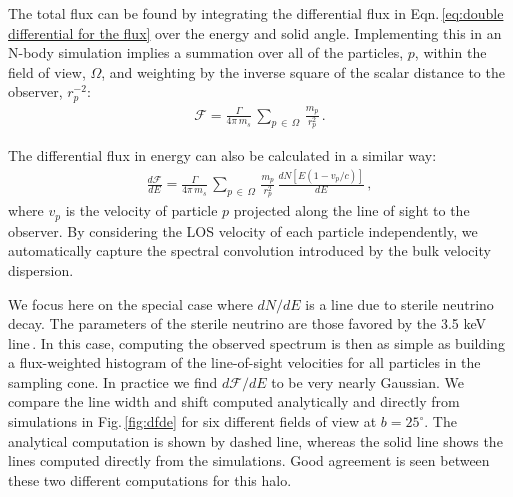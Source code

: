 \documentclass[aps,prd,10pt,twocolumn,superscriptaddress,showpacs,footinbib]{revtex4-1}
\begin{document}

The total flux can be found by integrating the differential flux in Eqn.\,\ref{eq:double differential for the flux} over the energy and solid angle.  Implementing this in an N-body simulation implies a summation over all of the particles, $p$, within the field of view, $\Omega$, and weighting by the inverse square of the scalar distance to the observer, $r^{-2}_p$:
\begin{eqnarray} 
\mathcal{F} = \frac{\Gamma}{4\pi \, m_s} \, \sum_{p \, \in \, \Omega} \, \frac{m_p}{r_p^{2}} \, .
\end{eqnarray}

The differential flux in energy can also be calculated in a similar way:
\begin{eqnarray}
\label{eq:discrete}
\frac{d\mathcal{F}}{dE} = \frac{\Gamma}{4 \pi \, m_s}\, \sum_{p \, \in \, \Omega} \,
\frac{m_p}{r_p^{2}} \, \frac{dN[E(1-v_p/c)]}{dE} \, ,
\end{eqnarray}
where $v_p$ is the velocity of particle $p$ projected along the line of sight to the observer.  By
considering the LOS velocity of each particle independently, we automatically capture the spectral
convolution introduced by the bulk velocity dispersion. 

We focus here on the special case where $dN/dE$ is a line due to sterile neutrino decay.  The
parameters of the sterile neutrino are those favored by the 3.5 keV line\,\cite{Bulbul:2014sua}.  In
this case, computing the observed spectrum is then as simple as building a flux-weighted histogram
of the line-of-sight velocities for all particles in the sampling cone. In practice we find
$d\mathcal{F}/dE$ to be very nearly Gaussian. %
We compare the line width and shift computed analytically and directly from simulations in
Fig.\,\ref{fig:dfde} for six different fields of view at $b=25^\circ$.  The analytical computation is 
shown by dashed line, whereas the solid line shows the lines computed directly from the simulations.  
Good agreement is seen between these two different computations for this halo.
\end{document}
